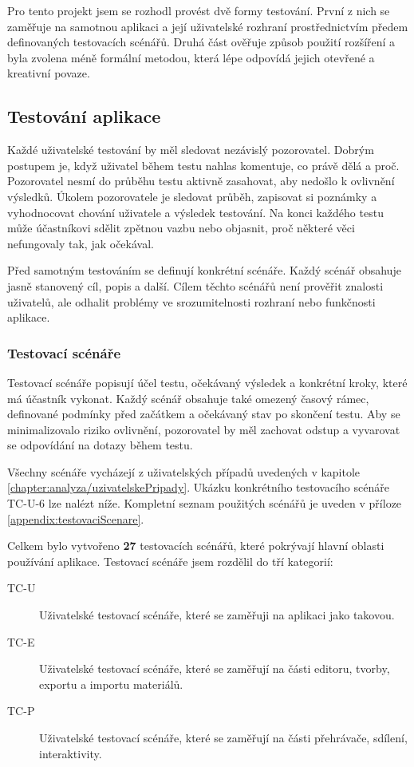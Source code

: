 Pro tento projekt jsem se rozhodl provést dvě formy testování.
První z nich se zaměřuje na samotnou aplikaci a její uživatelské rozhraní prostřednictvím předem definovaných testovacích scénářů. 
Druhá část ověřuje způsob použití rozšíření a byla zvolena méně formální metodou, která lépe odpovídá jejich otevřené a kreativní povaze.

\subsection{Testování aplikace}

Každé uživatelské testování by měl sledovat nezávislý pozorovatel. 
Dobrým postupem je, když uživatel během testu nahlas komentuje, co právě dělá a proč. 
Pozorovatel nesmí do průběhu testu aktivně zasahovat, aby nedošlo k ovlivnění výsledků. 
Úkolem pozorovatele je sledovat průběh, zapisovat si poznámky a vyhodnocovat chování uživatele a výsledek testování. 
Na konci každého testu může účastníkovi sdělit zpětnou vazbu nebo objasnit, proč některé věci nefungovaly tak, jak očekával.

Před samotným testováním se definují konkrétní scénáře.
Každý scénář obsahuje jasně stanovený cíl, popis a další. 
Cílem těchto scénářů není prověřit znalosti uživatelů, ale odhalit problémy ve srozumitelnosti rozhraní nebo funkčnosti aplikace.

\subsubsection{Testovací scénáře}

Testovací scénáře popisují účel testu, očekávaný výsledek a konkrétní kroky, které má účastník vykonat.
Každý scénář obsahuje také omezený časový rámec, definované podmínky před začátkem a očekávaný stav po skončení testu. 
Aby se minimalizovalo riziko ovlivnění, pozorovatel by měl zachovat odstup a vyvarovat se odpovídání na dotazy během testu.

Všechny scénáře vycházejí z uživatelských případů uvedených v kapitole \ref{chapter:analyza/uzivatelskePripady}.
Ukázku konkrétního testovacího scénáře TC-U-6 lze nalézt níže. 
Kompletní seznam použitých scénářů je uveden v příloze \ref{appendix:testovaciScenare}.

Celkem bylo vytvořeno \textbf{27} testovacích scénářů, které pokrývají hlavní oblasti používání aplikace.
Testovací scénáře jsem rozdělil do tří kategorií:

\begin{description}
    \item[TC-U] Uživatelské testovací scénáře, které se zaměřuji na aplikaci jako takovou. 
    \item[TC-E] Uživatelské testovací scénáře, které se zaměřují na části editoru, tvorby, exportu a importu materiálů.
    \item[TC-P] Uživatelské testovací scénáře, které se zaměřují na části přehrávače, sdílení, interaktivity.
\end{description}


